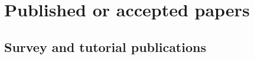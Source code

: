





\graphicspath{{Content/figures/PNG/}{Content/figures/JPG/}{Content/figures/PDF/}{Content/figures/}{Content/figures/EPS/}}

%
%
%
%
%
%
%
%

\chapter{Published or accepted papers}
\label{chap:papers}
%

\section{Survey and tutorial publications}

